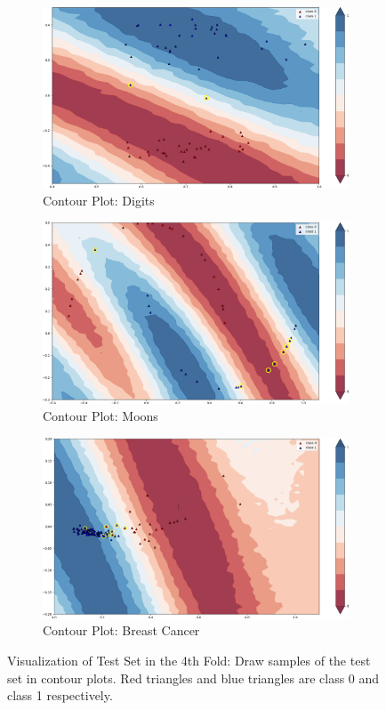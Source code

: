 \documentclass[sigconf]{acmart}
\begin{document}
\begin{figure}[!ht]
    \centering
    \begin{subfigure}{0.45\textwidth}
        \includegraphics[width=\textwidth]{./digits-2-cv4.png}
        \caption{Contour Plot: Digits}
    \end{subfigure}
    \begin{subfigure}{0.45\textwidth}
        \includegraphics[width=\textwidth]{./moons-cv4.png}
        \caption{Contour Plot: Moons}
    \end{subfigure}
    \begin{subfigure}{0.45\textwidth}
        \includegraphics[width=\textwidth]{./cancer-cv4.png}
        \caption{Contour Plot: Breast Cancer}
    \end{subfigure}
    \caption{Visualization of Test Set in the 4th Fold: \textnormal{Draw samples of the test set in contour plots. Red triangles and blue triangles are class 0 and class 1 respectively.}}
    \label{fig:contour}
\end{figure}
\end{document}
